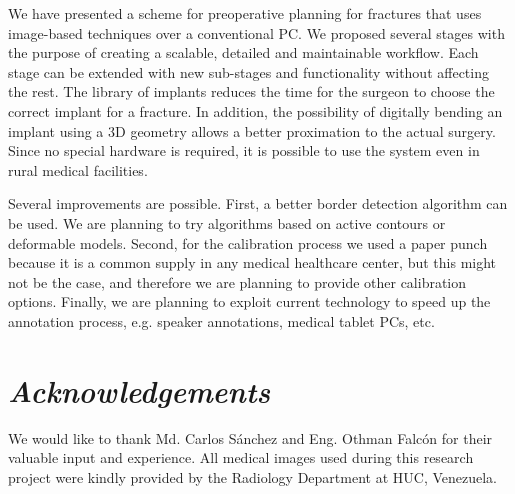 \documentclass{cimenics}
\begin{document}
We have presented a scheme for preoperative planning for fractures
that uses image-based techniques over a conventional PC. We
proposed several stages with the purpose of creating a scalable,
detailed and maintainable workflow. Each stage can be extended
with new sub-stages and functionality without affecting the rest.
The library of implants reduces the time for the surgeon to choose
the correct implant for a fracture. In addition, the possibility
of digitally bending an implant using a 3D geometry allows a
better proximation to the actual surgery. Since no special
hardware is required, it is possible to use the system even in
rural medical facilities.

Several improvements are possible. First, a better border
detection algorithm can be used. We are planning to try
algorithms based on active contours or deformable models. Second,
for the calibration process we used a paper punch because it is a
common supply in any medical healthcare center, but this might not
be the case, and therefore we are planning to provide other
calibration options. Finally, we are planning to exploit current
technology to speed up the annotation process, e.g. speaker
annotations, medical tablet PCs, etc.

\section*{\textit{Acknowledgements}}

We would like to thank Md. Carlos S\'anchez and Eng. Othman
Falc\'on for their valuable input and experience. All medical
images used during this research project were kindly provided by
the Radiology Department at HUC, Venezuela.
\end{document}
